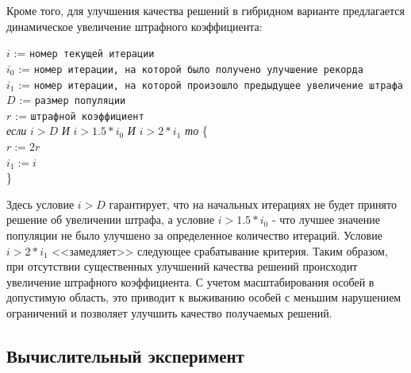 \documentclass{llncs}
\begin{document}
Кроме того, для улучшения качества решений в гибридном варианте предлагается динамическое увеличение штрафного коэффициента:

\begin{flushleft}
\small

$i$ := \verb"номер текущей итерации" \\
$i_0$ := \verb"номер итерации, на которой было получено улучшение рекорда"\\
$i_1$ := \verb"номер итерации, на которой произошло предыдущее увеличение штрафа"\\
$D$ := \verb"размер популяции"\\
$r$ := \verb"штрафной коэффициент"\\

\textit{если} $i > D$ \textit{И} $i > 1.5 * i_0$ \textit{И} $i > 2 * i_1$  \textit{то} \{\\
\leftskip=12pt
    $r := 2r$\\
    $i_1 := i$\\
    \leftskip=0pt
\}
\end{flushleft}

Здесь условие $i > D$ гарантирует, что на начальных итерациях не будет принято решение об увеличении штрафа, а условие $i > 1.5 * i_0$ - что лучшее значение популяции не было улучшено за определенное количество итераций. Условие $i > 2 * i_1$ <<замедляет>> следующее срабатывание критерия.
Таким образом, при отсутствии существенных улучшений качества решений происходит увеличение штрафного коэффициента. С учетом масштабирования особей в допустимую область, это приводит к выживанию особей с меньшим нарушением ограничений и позволяет улучшить качество получаемых решений. 

\subsection{Вычислительный эксперимент}\label{sec:exp:de}
\end{document}
